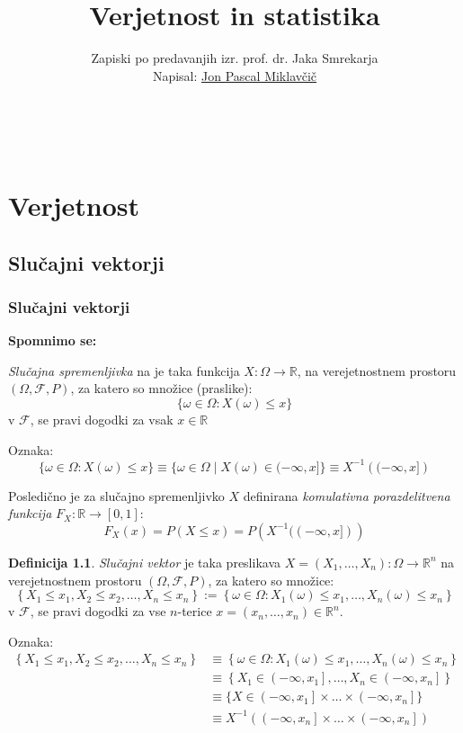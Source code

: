 \documentclass[12pt]{book}
\title{\Huge Verjetnost in statistika}
\author{\small Zapiski po predavanjih izr. prof. dr. Jaka Smrekarja \\ Napisal: \href{https://github.com/jonpascal/VIS-zapiski-predavanj}{Jon Pascal Miklavčič}}
\date{\filemodprintdate{\jobname}}
\makeatletter
\renewcommand{\maketitle}{
  \begin{titlepage}
    \begin{center}
      \vspace*{25mm} 
      \Huge\@title\par 
      \vspace{20mm} 
      \large\@author \\
      \vspace{140mm} 
      \large\@date\par 
    \end{center}
  \end{titlepage}
}
\def\n{\noindent}
\theoremstyle{definition}
\newtheorem{definicija}{Definicija}
\theoremstyle{plain}
\theoremstyle{plain}
\theoremstyle{plain}
\theoremstyle{plain}
\theoremstyle{remark}
\makeatother
\begin{document}
\frontmatter

\maketitle

\tableofcontents

\mainmatter

\part{Verjetnost}

\chapter{Slučajni vektorji}

\section{Slučajni vektorji}

\textbf{Spomnimo se:} 

\n \emph{Slučajna spremenljivka} na je taka funkcija $X: \Omega \to \mathbb{R}$, na verejetnostnem prostoru $(\Omega, \mathcal{F}, P)$, za katero so množice (praslike): 
$$
\{\omega \in \Omega: X(\omega) \leq x\}
$$
v $\mathcal{F}$, se pravi dogodki za vsak $x \in \mathbb{R}$

\n Oznaka:
$$
\{\omega \in \Omega: X(\omega) \leq x\} \equiv \{\omega \in \Omega \mid X(\omega) \in(-\infty, x]\} \equiv X^{-1}\left((-\infty, x]\right)
$$

\n Posledično je za slučajno spremenljivko $X$ definirana \emph{komulativna porazdelitvena funkcija} $F_X: \mathbb{R} \to [0,1]$:
$$
F_X(x)=P(X \leq x)=P\left(X^{-1}((-\infty, x])\right)
$$

\begin{definicija}
    \emph{Slučajni vektor} je taka preslikava $X=\left(X_1, \ldots, X_n\right): \Omega \to \mathbb{R}^n$ na verejetnostnem prostoru $(\Omega, \mathcal{F}, P)$, za katero so množice:
    $$
    \left\{X_1 \leq x_1, X_2 \leq x_2, \ldots, X_n \leq x_n\right\} :=\left\{\omega \in \Omega: X_1(\omega) \leq x_1, \ldots, X_n(\omega) \leq x_n\right\}
    $$
    v $\mathcal{F}$, se pravi dogodki za vse $n$-terice $x = \left(x_n, \ldots, x_n\right) \in \mathbb{R}^n$.
\end{definicija}

\n Oznaka: 
$$
\begin{aligned}
    \left\{X_1 \leq x_1, X_2 \leq x_2, \ldots, X_n \leq x_n\right\} &\equiv\left\{\omega \in \Omega: X_1(\omega) \leq x_1, \ldots, X_n(\omega) \leq x_n\right\} \\
    &\equiv \left\{X_1 \in\left(-\infty, x_1\right], \ldots, X_n \in\left(-\infty, x_n\right]\right\} \\ 
    &\equiv\{X \in\left(-\infty, x_1\right] \times \ldots \times\left(-\infty, x_n\right]\} \\
    &\equiv X^{-1}\left(\left(-\infty, x_n\right] \times \ldots \times\left(-\infty, x_n\right]\right)
\end{aligned}
$$
\end{document}
